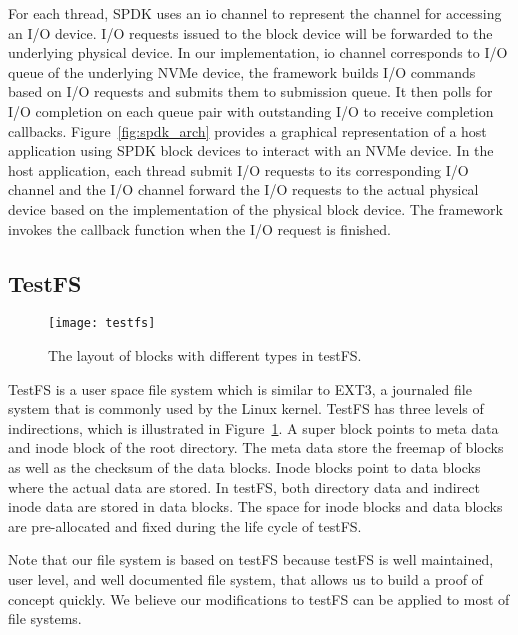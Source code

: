 For each thread, SPDK uses an io channel to represent the channel for accessing an 
I/O device. I/O requests issued to the block device will be forwarded to the underlying
physical device. In our implementation, io channel corresponds to I/O queue 
of the underlying NVMe device, the framework builds I/O commands based on I/O 
requests and submits them to submission queue. It then polls for I/O completion
on each queue pair with outstanding I/O to receive completion callbacks.  
Figure~\ref{fig:spdk_arch} provides a graphical
representation of a host application using SPDK block devices to interact with
an NVMe device. In the host application, each thread submit I/O requests to its
corresponding I/O channel and the I/O channel forward the I/O requests to the 
actual physical device based on the implementation of the physical block device.
The framework invokes the callback function when the I/O request is finished.

\subsection{TestFS}

\begin{figure}[t]
  \texttt{[image: testfs]}
  \caption{The layout of blocks with different types in testFS.}
  \label{fig:testfs}
\end{figure}
TestFS\cite{testfs} is a user space file system which is similar to EXT3, a
journaled file system that is commonly used by the Linux kernel. TestFS
has three levels of indirections, which is illustrated in Figure~\ref{fig:testfs}.
A super block points to meta data and inode block of the root directory. 
The meta data store the freemap of blocks as well as the checksum of the data blocks.
Inode blocks point to data blocks where the actual data are stored. In testFS, both 
directory data and indirect inode data are stored in data blocks. The
space for inode blocks and data blocks are pre-allocated and fixed during the
life cycle of testFS.

Note that our file system is based on testFS because testFS is well maintained, user
level, and well documented file system, that allows us to build a proof of concept
quickly. We believe our modifications to testFS can be applied to most of file systems.